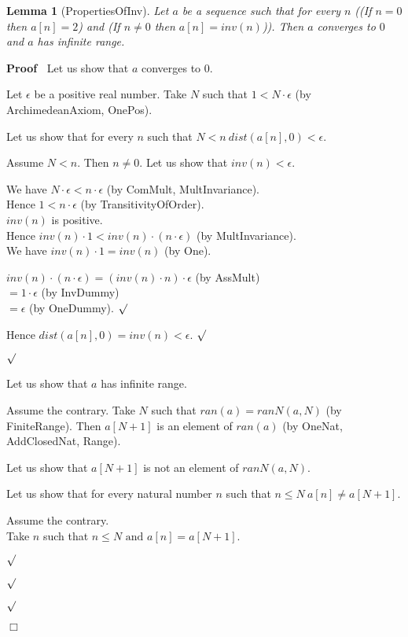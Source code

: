 \documentclass{article}
\newenvironment{forthel}{\begin{leftbar}}{\end{leftbar}}
\newenvironment{proof}{\noindent\textbf{Proof\ }}{\hspace*{\fill}$\Box$\medskip}
\newenvironment{subproof}{\begin{list}{}{}
		\item[\text{Proof}]}{\hfill $\surd$ \end{list}}
\newtheorem{lemma}{Lemma}
\newcommand{\dotequal}{=}
\begin{document}
\begin{forthel}
	\begin{lemma}[PropertiesOfInv]
		Let $a$ be a sequence such that for every $n$
		((If $n = 0$ then $a[n] = 2$) and (If $n \neq 0$ then $a[n] = inv(n)$)).
		Then $a$ converges to $0$ and $a$ has infinite range.
	\end{lemma}
	\begin{proof}
		Let us show that $a$ converges to $0$.
		\begin{subproof}
			Let $\epsilon$ be a positive real number. 
			Take $N$ such that $1 < N \cdot \epsilon$ (by ArchimedeanAxiom, OnePos).
	
			Let us show that for every $n$ such that $N < n \ dist(a[n],0) < \epsilon$.
			\begin{subproof}
				Assume $N < n$. Then $n \neq 0$.
				Let us show that $inv(n) < \epsilon$.
				\begin{subproof}
					We have $N \cdot \epsilon < n \cdot \epsilon$ (by ComMult, MultInvariance).\\
					Hence $1 < n \cdot \epsilon$ (by TransitivityOfOrder).\\
					$inv(n)$ is positive.\\
					Hence $inv(n) \cdot 1 < inv(n) \cdot (n \cdot \epsilon)$ (by MultInvariance).\\
					We have $inv(n) \cdot 1 = inv(n)$ (by One).
				
					$inv(n) \cdot (n \cdot \epsilon) \dotequal (inv(n) \cdot n) \cdot \epsilon$ (by AssMult)\\
					$\dotequal 1 \cdot \epsilon$ (by InvDummy)\\
					$\dotequal \epsilon$ (by OneDummy).
				\end{subproof}
				Hence $dist(a[n],0) = inv(n) < \epsilon$.
			\end{subproof}
		\end{subproof}
		Let us show that $a$ has infinite range.
		\begin{subproof}
			Assume the contrary.
			Take $N$ such that $ran(a) = ranN(a,N)$ (by FiniteRange).
			Then $a[N + 1]$ is an element of $ran(a)$ (by OneNat, AddClosedNat, Range).
			
			Let us show that $a[N + 1]$ is not an element of $ranN(a,N)$.
			\begin{subproof}
				Let us show that for every natural number $n$ such that $n \leq N \ a[n] \neq a[N + 1]$.
				\begin{subproof}
					Assume the contrary.\\
					Take $n$ such that $n \leq N \text{ and } a[n] = a[N + 1]$.
					

\end{subproof}
\end{subproof}
\end{subproof}
\end{proof}
\end{forthel}
\end{document}
